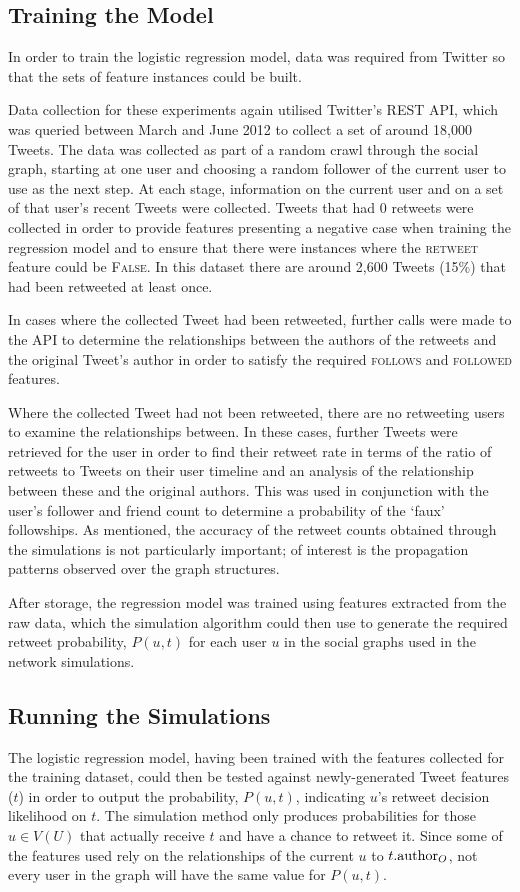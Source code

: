 \subsection{Training the Model}
In order to train the logistic regression model, data was required from Twitter so that the sets of feature instances could be built. 

Data collection for these experiments again utilised Twitter's REST API, which was queried between March and June 2012 to collect a set of around 18,000 Tweets. The data was collected as part of a random crawl through the social graph, starting at one user and choosing a random follower of the current user to use as the next step. At each stage, information on the current user and on a set of that user's recent Tweets were collected. Tweets that had 0 retweets were collected in order to provide features presenting a negative case when training the regression model and to ensure that there were instances where the \textsc{retweet} feature could be \textsc{False}. In this dataset there are around 2,600 Tweets (15\%) that had been retweeted at least once.

In cases where the collected Tweet had been retweeted, further calls were made to the API to determine the relationships between the authors of the retweets and the original Tweet's author in order to satisfy the required \textsc{follows} and \textsc{followed} features.

Where the collected Tweet had not been retweeted, there are no retweeting users to examine the relationships between. In these cases, further Tweets were retrieved for the user in order to find their retweet rate in terms of the ratio of retweets to Tweets on their user timeline and an analysis of the relationship between these and the original authors. This was used in conjunction with the user's follower and friend count to determine a probability of the `faux' followships. As mentioned, the accuracy of the retweet counts obtained through the simulations is not particularly important; of interest is the propagation patterns observed over the graph structures.

After storage, the regression model was trained using features extracted from the raw data, which the simulation algorithm could then use to generate the required retweet probability, $P(u,t)$ for each user $u$ in the social graphs used in the network simulations.


\subsection{Running the Simulations}
The logistic regression model, having been trained with the features collected for the training dataset, could then be tested against newly-generated Tweet features ($t$) in order to output the probability, $P(u,t)$, indicating $u$'s retweet decision likelihood on $t$. The simulation method only produces probabilities for those $u \in V(U)$ that actually receive $t$ and have a chance to retweet it. Since some of the features used rely on the relationships of the current $u$ to $t.\textrm{author}_O$, not every user in the graph will have the same value for $P(u,t)$.

